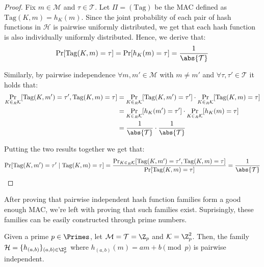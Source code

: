 \documentclass[a4paper, 12pt]{report}
\begin{document}
    \begin{proof}
        Fix $m \in \mathcal{M}$ and $\tau \in \mathcal{T}$. Let $\Pi = (\mathrm{Tag})$ be the MAC defined as $\mathrm{Tag}(K,m) = h_K(m)$. Since the joint probability of each pair of hash functions in $\mathcal{H}$ is pairwise uniformly distributed, we get that each hash function is also individually uniformly distributed. Hence, we derive that:
        \[\Pr[\mathrm{Tag}(K,m) = \tau] = \Pr[h_K(m) = \tau] = \frac{1}{\abs{\mathcal{T}}}\]

        Similarly, by pairwise independence $\forall m, m' \in \mathcal{M}$ with $m \neq m'$ and $\forall \tau, \tau' \in \mathcal{T}$ it holds that:
        \[\begin{split}
            \Pr_{K \in_R \mathcal{K}}[\mathrm{Tag}(K,m') = \tau', \mathrm{Tag}(K,m) = \tau] &= \Pr_{K \in_R \mathcal{K}}[\mathrm{Tag}(K,m') = \tau'] \cdot \Pr_{K \in_R \mathcal{K}}[\mathrm{Tag}(K,m) = \tau] \\
            &= \Pr_{K \in_R \mathcal{K}}[h_K(m') = \tau'] \cdot \Pr_{K \in_R \mathcal{K}}[h_K(m) = \tau] \\
            &= \frac{1}{\abs{\mathcal{T}}} \cdot \frac{1}{\abs{\mathcal{T}}}
        \end{split}\]

        Putting the two results together we get that:
        \[\Pr[\mathrm{Tag}(K,m') = \tau' \mid \mathrm{Tag}(K,m) = \tau] = \frac{\Pr_{K \in_R \mathcal{K}}[\mathrm{Tag}(K,m') = \tau', \mathrm{Tag}(K,m) = \tau]}{\Pr[\mathrm{Tag}(K,m) = \tau]} = \frac{1}{\abs{\mathcal{T}}}\]
    \end{proof}

    After proving that pairwise independent hash function families form a good enough MAC, we're left with proving that such families exist. Suprisingly, these families can be easily constructed through prime numbers.
    
    \begin{framedprop}{}
        Given a prime $p \in \Primes$, let $\mathcal{M} = \mathcal{T} = \Z_p$ and $\mathcal{K} = \Z_p^2$. Then, the family $\mathcal{H} = \{h_{(a,b)}\}_{(a,b) \in \Z_p^2}$ where $h_{(a,b)}(m) = am+b \pmod{p}$ is pairwise independent.
    \end{framedprop}
\end{document}

